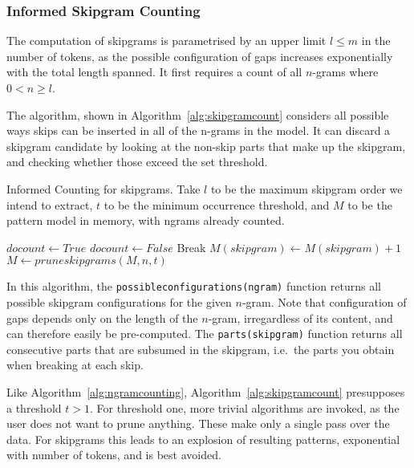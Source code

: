 \documentclass[a4paper,12pt]{article}
\begin{document}
\subsubsection{Informed Skipgram Counting}
\label{sec:skipgramcount}

The computation of skipgrams is parametrised by an upper limit $l\leq m$ in the number of
tokens, as the possible configuration of gaps increases exponentially with the
total length spanned. It first requires a count of all $n$-grams where $0<n\geq l$. 

The algorithm, shown in Algorithm~\ref{alg:skipgramcount} considers all
possible ways skips can be inserted in all of the n-grams in the model. It can
discard a skipgram candidate by looking at the non-skip parts that make up the
skipgram, and checking whether those exceed the set threshold. 

\begin{algorithm} \caption{Informed Counting for skipgrams.  Take $l$
to be the maximum skipgram order we intend to extract, $t$ to be the minimum occurrence threshold, and $M$ to be the
pattern model in memory, with ngrams already counted.}
\label{alg:skipgramcount}
\begin{algorithmic}
            \State $docount \leftarrow True$
                    \State $docount \leftarrow False$
                    Break
                \EndIf
            \EndFor 
                \State $M(skipgram) \leftarrow M(skipgram) + 1$
            \EndIf
            \EndFor 
            \EndFor
    \State $M \leftarrow pruneskipgrams(M,n,t)$
\EndFor \\
\end{algorithmic}
\end{algorithm}

In this algorithm, the \texttt{possibleconfigurations(ngram)} function returns
all possible skipgram configurations for the given $n$-gram. Note that
configuration of gaps depends only on the length of the $n$-gram, irregardless
of its content, and can therefore easily be pre-computed. The
\texttt{parts(skipgram)} function returns all consecutive parts that are
subsumed in the skipgram, i.e.\ the parts you obtain when breaking at each
skip.

Like Algorithm~\ref{alg:ngramcounting}, Algorithm~\ref{alg:skipgramcount}
presupposes a threshold $t>1$. For threshold one, more trivial algorithms are
invoked, as the user does not want to prune anything. These make only a single
pass over the data. For skipgrams this leads to an explosion of
resulting patterns, exponential with number of tokens, and is best avoided.
\end{document}
